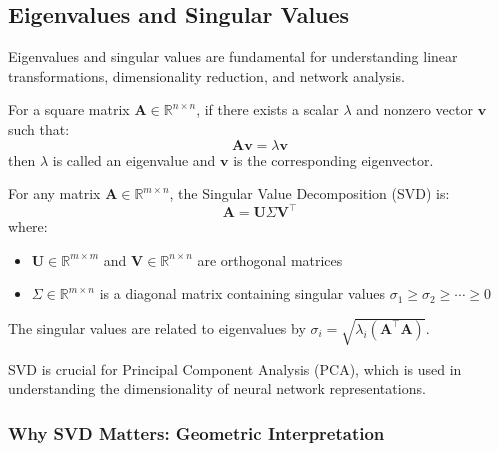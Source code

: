 \subsection{Eigenvalues and Singular Values}

Eigenvalues and singular values are fundamental for understanding linear transformations, dimensionality reduction, and network analysis.

\begin{definition}
For a square matrix $\mathbf{A} \in \mathbb{R}^{n \times n}$, if there exists a scalar $\lambda$ and nonzero vector $\mathbf{v}$ such that:
\begin{equation}
\mathbf{A}\mathbf{v} = \lambda \mathbf{v}
\end{equation}
then $\lambda$ is called an eigenvalue and $\mathbf{v}$ is the corresponding eigenvector.
\end{definition}

\begin{definition}
For any matrix $\mathbf{A} \in \mathbb{R}^{m \times n}$, the Singular Value Decomposition (SVD) is:
\begin{equation}
\mathbf{A} = \mathbf{U}\Sigma\mathbf{V}^\top
\end{equation}
where:
\begin{itemize}
    \item $\mathbf{U} \in \mathbb{R}^{m \times m}$ and $\mathbf{V} \in \mathbb{R}^{n \times n}$ are orthogonal matrices
    \item $\Sigma \in \mathbb{R}^{m \times n}$ is a diagonal matrix containing singular values $\sigma_1 \geq \sigma_2 \geq \cdots \geq 0$
\end{itemize}
The singular values are related to eigenvalues by $\sigma_i = \sqrt{\lambda_i(\mathbf{A}^\top\mathbf{A})}$.
\end{definition}

SVD is crucial for Principal Component Analysis (PCA), which is used in understanding the dimensionality of neural network representations.

\subsubsection{Why SVD Matters: Geometric Interpretation}

